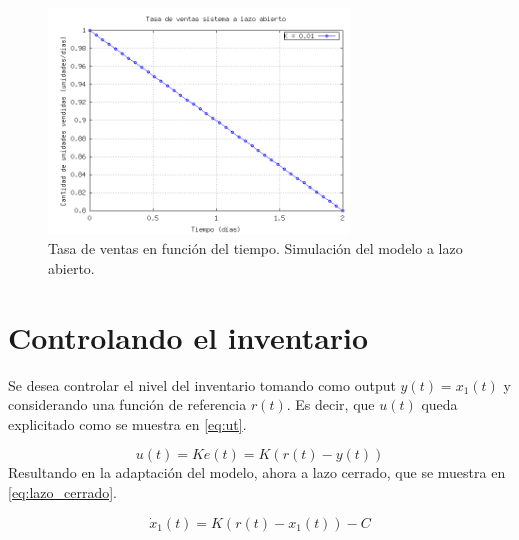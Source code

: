 \documentclass{sig-alternate}
\begin{document}
\begin{figure}[h]
\begin{center}
\includegraphics[width=8cm]{../src/lazo_abierto2.png}
\caption{\label{fig:lazo_abierto2} Tasa de ventas en función del tiempo. Simulación del modelo a lazo abierto.}
\end{center}
\end{figure}

\section{Controlando el inventario}
\label{inventary_control_section} 
Se desea controlar el nivel del inventario tomando como output $y(t)=x_{1}(t)$ y considerando
una función de referencia $r(t)$. Es decir, que $u(t)$ queda explicitado como se muestra en \eqref{eq:ut}.

\begin{equation}
u(t)= Ke(t) = K(r(t)-y(t))\label{eq:ut}\end{equation}
Resultando en la adaptación del modelo, ahora a lazo cerrado, que se muestra en \eqref{eq:lazo_cerrado}.

\begin{equation}
\dot{x}_1(t) = K(r(t) - x_{1}(t)) - C\label{eq:lazo_cerrado}\end{equation}
\end{document}
